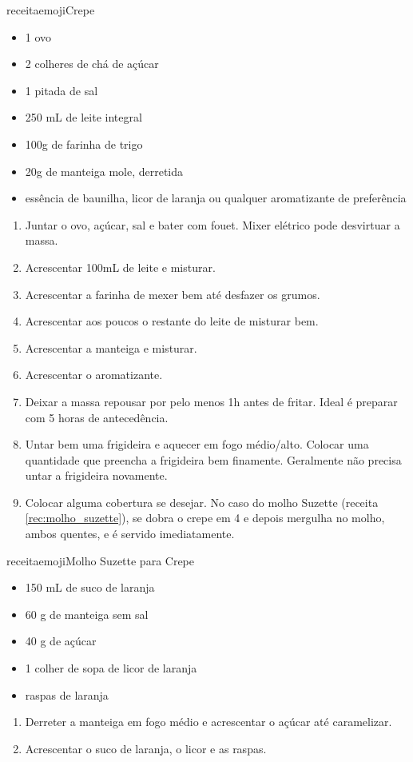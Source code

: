 receitaemoji{Crepe\label{rec:crepe}}{
		\begin{itemize}
			\item 1 ovo
			\item 2 colheres de chá de açúcar
			\item 1 pitada de sal
			\item 250 mL de leite integral
			\item 100g de farinha de trigo
			\item 20g de manteiga mole, derretida
			\item essência de baunilha, licor de laranja ou qualquer aromatizante de
			      preferência
		\end{itemize}
	}{
		\begin{enumerate}
			\item Juntar o ovo, açúcar, sal e bater com fouet. Mixer elétrico pode
			      desvirtuar a massa.
			\item Acrescentar 100mL de leite e misturar.
			\item Acrescentar a farinha de mexer bem até desfazer os grumos.
			\item Acrescentar aos poucos o restante do leite de misturar bem.
			\item Acrescentar a manteiga e misturar.
			\item Acrescentar o aromatizante.
			\item Deixar a massa repousar por pelo menos 1h antes de fritar. Ideal é
			      preparar com 5 horas de antecedência.
			\item Untar bem uma frigideira e aquecer em fogo médio/alto. Colocar uma
			      quantidade que preencha a frigideira bem finamente. Geralmente não precisa
			      untar a frigideira novamente.
			\item Colocar alguma cobertura se desejar. No caso do molho Suzette (receita
			      \ref{rec:molho_suzette}), se dobra o crepe em 4 e depois mergulha no molho,
			      ambos quentes, e é servido imediatamente.
		\end{enumerate}
	}

receitaemoji{Molho Suzette para Crepe\label{rec:molho_suzette}}{
		\begin{itemize}
			\item 150 mL de suco de laranja
			\item 60 g de manteiga sem sal
			\item 40 g de açúcar
			\item 1 colher de sopa de licor de laranja
			\item raspas de laranja
		\end{itemize}
	}{
		\begin{enumerate}
			\item Derreter a manteiga em fogo médio e acrescentar o açúcar até
			      caramelizar.
			\item Acrescentar o suco de laranja, o licor e as raspas.
		\end{enumerate}
	}


